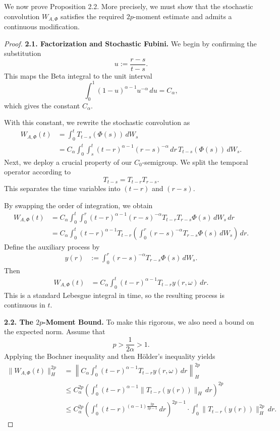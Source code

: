 \documentclass[11pt]{article}
\theoremstyle{definition}
\theoremstyle{remark}
\begin{document}
We now prove Proposition 2.2. More precisely, we must show that the stochastic convolution \(W_{A,\Phi}\) satisfies the required \(2p\)-moment estimate and admits a continuous modification.

\begin{proof}
\noindent\textbf{2.1. Factorization and Stochastic Fubini.}
We begin by confirming the substitution
\[
u:=\frac{r-s}{t-s}.
\]
This maps the Beta integral to the unit interval
\[
\int_0^1 (1-u)^{\alpha-1}u^{-\alpha}\,du=C_\alpha,
\]
which gives the constant \(C_\alpha\).

With this constant, we rewrite the stochastic convolution as
\begin{align*}
W_{A,\Phi}(t)
&=
\int_0^t T_{t-s}(\Phi(s))\,dW_s \\
&=
C_\alpha\int_0^t\int_s^t (t-r)^{\alpha-1}(r-s)^{-\alpha}\,dr\,T_{t-s}(\Phi(s))\,dW_s.
\end{align*}
Next, we deploy a crucial property of our \(C_0\)-semigroup. We split the temporal operator according to
\[
T_{t-s}=T_{t-r}T_{r-s}.
\]
This separates the time variables into \((t-r)\) and \((r-s)\).

By swapping the order of integration, we obtain
\begin{align*}
W_{A,\Phi}(t)
&=
C_\alpha\int_0^t\int_0^r (t-r)^{\alpha-1}(r-s)^{-\alpha}T_{t-r}T_{r-s}\Phi(s)\,dW_s\,dr \\
&=
C_\alpha\int_0^t (t-r)^{\alpha-1}T_{t-r}\left(\int_0^r (r-s)^{-\alpha}T_{r-s}\Phi(s)\,dW_s\right)\,dr.
\end{align*}
Define the auxiliary process by
\begin{align*}
y(r)
&:=
\int_0^r (r-s)^{-\alpha}T_{r-s}\Phi(s)\,dW_s.
\end{align*}
Then
\begin{align*}
W_{A,\Phi}(t)
&=
C_\alpha\int_0^t (t-r)^{\alpha-1}T_{t-r}y(r,\omega)\,dr.
\end{align*}
This is a standard Lebesgue integral in time, so the resulting process is continuous in \(t\).

\medskip

\noindent\textbf{2.2. The \(2p\)-Moment Bound.}
To make this rigorous, we also need a bound on the expected norm. Assume that
\[
p>\frac{1}{2\alpha}>1.
\]
Applying the Bochner inequality and then H\"older's inequality yields
\begin{align*}
\|W_{A,\Phi}(t)\|_H^{2p}
&=
\left\|C_\alpha\int_0^t (t-r)^{\alpha-1}T_{t-r}y(r,\omega)\,dr\right\|_H^{2p} \\
&\le
C_\alpha^{2p}\left(\int_0^t (t-r)^{\alpha-1}\|T_{t-r}(y(r))\|_H\,dr\right)^{2p} \\
&\le
C_\alpha^{2p}
\left(\int_0^t (t-r)^{(\alpha-1)\frac{2p}{2p-1}}\,dr\right)^{2p-1}
\cdot \int_0^t \|T_{t-r}(y(r))\|_H^{2p}\,dr.
\end{align*}


\end{proof}
\end{document}
